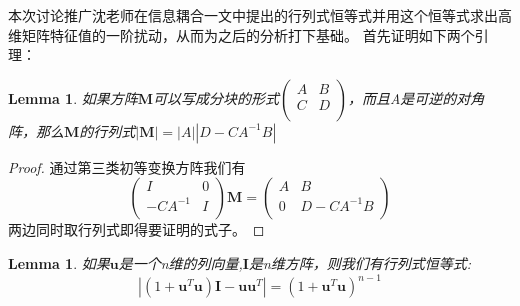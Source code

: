 \documentclass[12pt]{article}
\newtheorem{lem}[thm]{Lemma}
\theoremstyle{remark}
\begin{document}
\title{\textbf{}} 

\author{}
\maketitle
\large
本次讨论推广沈老师在信息耦合一文中提出的行列式恒等式并用这个恒等式求出高维矩阵特征值的一阶扰动，从而为之后的分析打下基础。
首先证明如下两个引理：
\begin{lem}如果方阵$\bm{M}$可以写成分块的形式$\left(\begin{array}{cc}
A&B\\
C&D\\
\end{array}\right)$，而且A是可逆的对角阵，那么$\bm{M}$的行列式$|\bm{M}|=|A||D-CA^{-1}B|$
\end{lem}
\begin{proof}
通过第三类初等变换方阵我们有\[
\left(\begin{array}{cc}
I&0\\
-CA^{-1}&I\\
\end{array}\right) \bm{M}=\left(\begin{array}{cc}
A&B\\
0&D-CA^{-1}B\\
\end{array}\right)\]
两边同时取行列式即得要证明的式子。
\end{proof}
\begin{lem}
如果$\bm{u}$是一个n维的列向量,$\bm{I}$是n维方阵，则我们有行列式恒等式:
\begin{equation}\label{eq:con_eq}
|(1+\bm{u}^T\bm{u})\bm{I}-\bm{u}\bm{u}^T|=(1+\bm{u}^T\bm{u})^{n-1}
\end{equation}
\end{lem}
\end{document}

